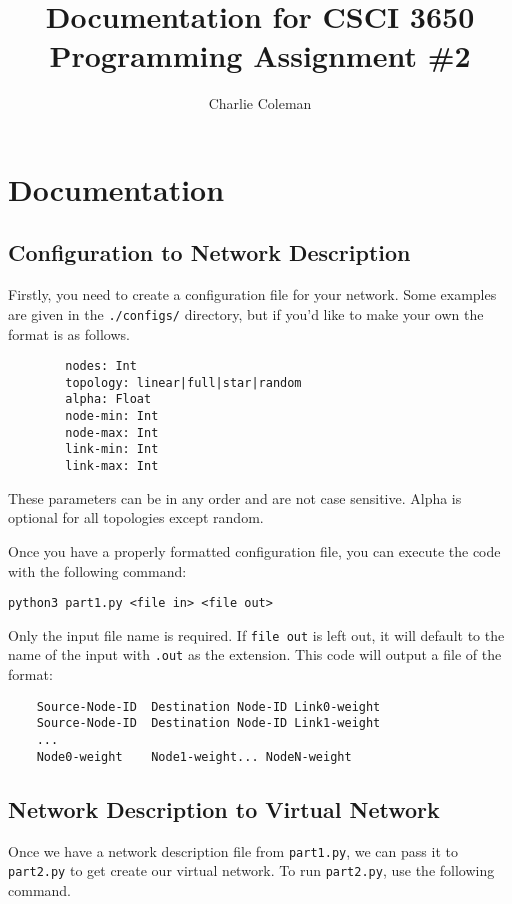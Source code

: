 \documentclass{article}
\title{Documentation for CSCI 3650 Programming Assignment \#2}
\author{Charlie Coleman}
\begin{document}
	\maketitle

	\section{Documentation}

	\subsection{Configuration to Network Description}
	
	Firstly, you need to create a configuration file for your network. Some examples are given in the \texttt{./configs/} directory, but if you'd like to make your own the format is as follows.
	
	\begin{verbatim}
		nodes: Int
		topology: linear|full|star|random
		alpha: Float
		node-min: Int
		node-max: Int
		link-min: Int
		link-max: Int
	\end{verbatim}
	
	These parameters can be in any order and are not case sensitive. Alpha is optional for all topologies except random.
	
	Once you have a properly formatted configuration file, you can execute the code with the following command:
	
	\begin{center}
	\verb|python3 part1.py <file in> <file out>|
	\end{center}	
	
	Only the input file name is required. If \texttt{file out} is left out, it will default to the name of the input with \texttt{.out} as the extension. This code will output a file of the format:
	
	\begin{verbatim}
	Source-Node-ID	Destination Node-ID	Link0-weight
	Source-Node-ID	Destination Node-ID	Link1-weight
	...
	Node0-weight	Node1-weight...	NodeN-weight
	\end{verbatim}

	\subsection{Network Description to Virtual Network}
	
	Once we have a network description file from \texttt{part1.py}, we can pass it to \texttt{part2.py} to get create our virtual network. To run \texttt{part2.py}, use the following command.
	
\end{document}
